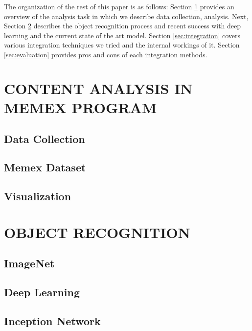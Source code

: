 \documentclass[letterpaper, 10 pt, conference]{ieeeconf}  %
\begin{document}
The organization of the rest of this paper is as follows: Section \ref{sec:memex} provides an overview of the analysis task in which we describe data collection, analysis. Next, Section \ref{sec:obj-rec} describes the object recognition process and recent success with deep learning and the current state of the art model. Section \ref{sec:integration} covers various integration techniques we tried and the internal workings of it. Section \ref{sec:evaluation} provides pros and cons of each integration methods.

\section{CONTENT ANALYSIS IN MEMEX PROGRAM} \label{sec:memex}

\subsection{Data Collection}
\label{sec:memex-datacollection}

\subsection{Memex Dataset} \label{sec:memex-dataset}

\subsection{Visualization} \label{sec:memex-visualization}

\section{OBJECT RECOGNITION} \label{sec:obj-rec}
\subsection{ImageNet} \label{sec:imagenet}
\subsection{Deep Learning } \label{sec:deeplearning-imagenet}
\subsection{Inception Network } \label{sec:inceptionnet}
\end{document}
